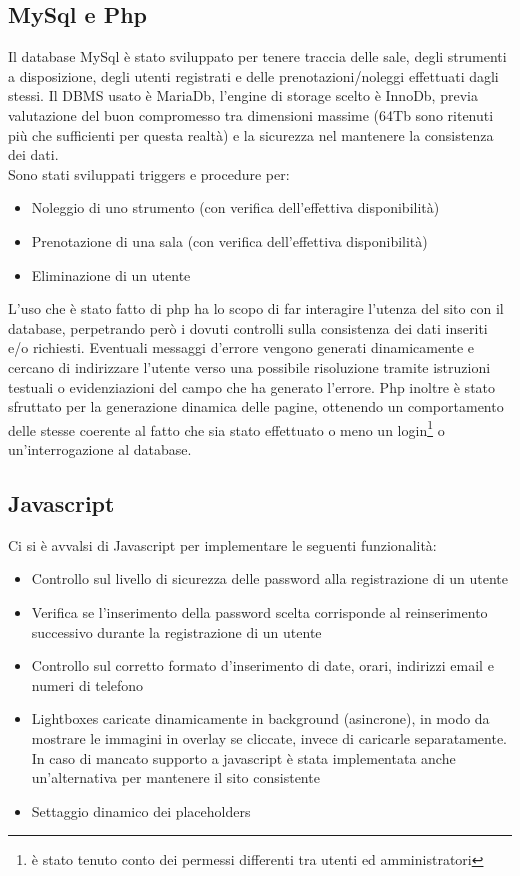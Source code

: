 \subsection{MySql e Php}
Il database MySql è stato sviluppato per tenere traccia delle sale, degli strumenti a disposizione, degli utenti registrati e delle prenotazioni/noleggi effettuati dagli stessi. Il DBMS usato è MariaDb, l'engine di storage scelto è InnoDb, previa valutazione del buon compromesso tra dimensioni massime (64Tb sono ritenuti più che sufficienti per questa realtà) e la sicurezza nel mantenere la consistenza dei dati.\\
Sono stati sviluppati triggers e procedure per:
\begin{itemize}
\item Noleggio di uno strumento (con verifica dell'effettiva disponibilità)
\item Prenotazione di una sala (con verifica dell'effettiva disponibilità)
\item Eliminazione di un utente
\end{itemize}
L'uso che è stato fatto di php ha lo scopo di far interagire l'utenza del sito con il database, perpetrando però i dovuti controlli sulla consistenza dei dati inseriti e/o richiesti. Eventuali messaggi d'errore vengono generati dinamicamente e cercano di indirizzare l'utente verso una possibile risoluzione tramite istruzioni testuali o evidenziazioni del campo che ha generato l'errore. Php inoltre è stato sfruttato per la generazione dinamica delle pagine, ottenendo un comportamento delle stesse coerente al fatto che sia stato effettuato o meno un login\footnote{è stato tenuto conto dei permessi differenti tra utenti ed amministratori} o un'interrogazione al database.

\pagebreak

\subsection{Javascript}
Ci si è avvalsi di Javascript per implementare le seguenti funzionalità:
\begin{itemize}
\item Controllo sul livello di sicurezza delle password alla registrazione di un utente
\item Verifica se l'inserimento della password scelta corrisponde al reinserimento successivo durante la registrazione di un utente
\item Controllo sul corretto formato d'inserimento di date, orari, indirizzi email e numeri di telefono
\item Lightboxes caricate dinamicamente in background (asincrone), in modo da mostrare le immagini in overlay se cliccate, invece di caricarle separatamente. In caso di mancato supporto a javascript è stata implementata anche un'alternativa per mantenere il sito consistente
\item Settaggio dinamico dei placeholders
\end{itemize}